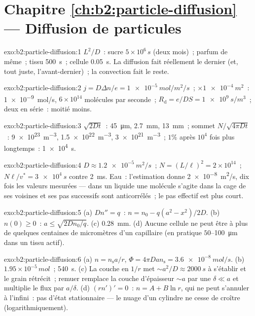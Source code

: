 \section*{Chapitre \ref{ch:b2:particle-diffusion} --- Diffusion de particules}

\begin{solution}{exo:b2:particle-diffusion:1}
$L^2/D$~: sucre $5 \times 10^6\,\unit{s}$ (deux mois)~; parfum de même~;
tissu \qty{500}{s}~; cellule \qty{0.05}{s}. La diffusion fait réellement le dernier
(et, tout juste, l'avant-dernier)~; la convection fait le reste.
\end{solution}

\begin{solution}{exo:b2:particle-diffusion:2}
$j = D\Delta n/e = \qty{1e-5}{mol/m^2/s}$~; $\times \qty{1e-4}{m^2}$~:
\qty{1e-9}{mol/s}, $6 \times 10^{14}$ molécules par seconde~;
$R_{\text{d}} = e/DS = \qty{1e9}{s/m^3}$~; deux en série~: moitié moins.
\end{solution}

\begin{solution}{exo:b2:particle-diffusion:3}
$\sqrt{2Dt}$~: \qty{45}{\micro m}, \qty{2.7}{mm}, \qty{13}{mm}~; sommet $N/\sqrt{4\pi
Dt}$~: \qty{9e23}{m^{-3}}, \qty{1.5e22}{m^{-3}}, \qty{3e21}{m^{-3}}~; $1\%$
après $10^4$ fois plus longtemps~: \qty{1e4}{s}.
\end{solution}

\begin{solution}{exo:b2:particle-diffusion:4}
$D \approx \qty{1.2e-5}{m^2/s}$~; $N = (L/\ell)^2 = 2 \times 10^{14}$~; $N\ell/v^*
= \qty{3e4}{s}$ contre \qty{2}{ms}. Eau~: l'estimation donne
\qty{2e-8}{m^2/s}, dix fois les valeurs mesurées --- dans un liquide une
molécule s'agite dans la cage de ses voisines et ses pas successifs
sont anticorrélés~; le pas effectif est plus court.
\end{solution}

\begin{solution}{exo:b2:particle-diffusion:5}
(a) $Dn'' = q$~: $n = n_0 - q(a^2 - x^2)/2D$. (b) $n(0) \ge 0$~: $a \le
\sqrt{2Dn_0/q}$. (c) \qty{0.28}{mm}. (d) Aucune cellule ne peut être à plus de
quelques centaines de micromètres d'un capillaire (en pratique $50$--\qty{100}{\micro m}
dans un tissu actif).
\end{solution}

\begin{solution}{exo:b2:particle-diffusion:6}
(a) $n = n_{\text{s}}a/r$, $\Phi = 4\pi D a n_{\text{s}} = \qty{3.6e-8}{mol/s}$.
(b) $1.95 \times 10^{-5}\,\unit{mol}$~; \qty{540}{s}. (c) La couche en $1/r$ met
$\sim a^2/D \approx \qty{2000}{s}$ à s'établir et le grain rétrécit~; remuer
remplace la couche d'épaisseur $\sim a$ par une  $\delta \ll a$
et multiplie le flux par $a/\delta$. (d) $(rn')' = 0$~: $n = A + B\ln r$,
qui ne peut s'annuler à l'infini~: pas d'état stationnaire --- le nuage d'un
cylindre ne cesse de croître (logarithmiquement).
\end{solution}

